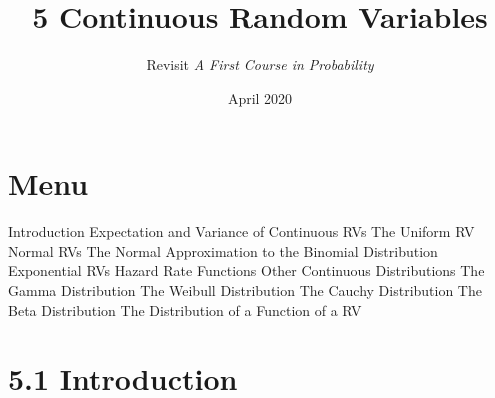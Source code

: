 \documentclass{article}
\title{5 Continuous Random Variables}
\author{Revisit \emph{A First Course in Probability}}
\date{April 2020}
\begin{document}
\maketitle

\section*{Menu}
\begin{outline}[enumerate]
    \1  Introduction
    \1  Expectation and Variance of Continuous RVs 
    \1  The Uniform RV
    \1  Normal RVs
        \2 The Normal Approximation to the Binomial Distribution
    \1  Exponential RVs
        \2 Hazard Rate Functions
    \1  Other Continuous Distributions
        \2 The Gamma Distribution
        \2 The Weibull Distribution
        \2 The Cauchy Distribution
        \2 The Beta Distribution
    \1  The Distribution of a Function of a RV
\end{outline}


\section*{5.1 Introduction}






\end{document}

